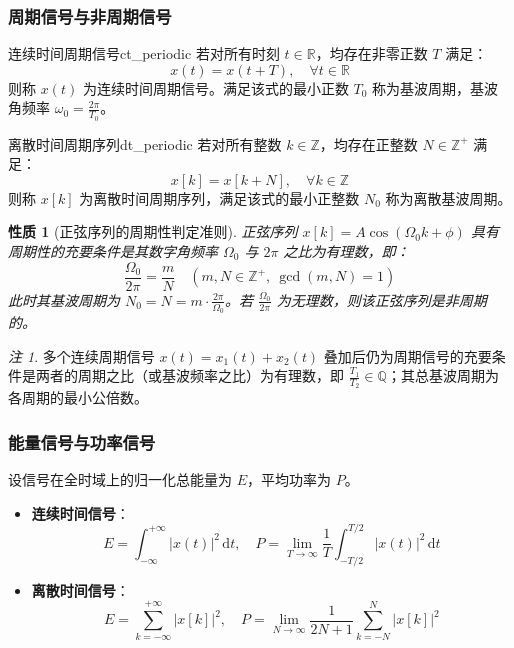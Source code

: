 \documentclass[11pt,a4paper,fontset=fandol]{ctexart}
\newtheorem{property}[theorem]{性质}
\theoremstyle{remark}
\newtheorem{remark}{注}[section]
\begin{document}
\subsubsection{周期信号与非周期信号}
\begin{definition}{连续时间周期信号}{ct_periodic}
若对所有时刻 $t \in \mathbb{R}$，均存在非零正数 $T$ 满足：
\begin{equation}
    x(t) = x(t + T), \quad \forall t \in \mathbb{R}
\end{equation}
则称 $x(t)$ 为连续时间周期信号。满足该式的最小正数 $T_0$ 称为基波周期，基波角频率 $\omega_0 = \frac{2\pi}{T_0}$。
\end{definition}

\begin{definition}{离散时间周期序列}{dt_periodic}
若对所有整数 $k \in \mathbb{Z}$，均存在正整数 $N \in \mathbb{Z}^+$ 满足：
\begin{equation}
    x[k] = x[k + N], \quad \forall k \in \mathbb{Z}
\end{equation}
则称 $x[k]$ 为离散时间周期序列，满足该式的最小正整数 $N_0$ 称为离散基波周期。
\end{definition}

\begin{property}[正弦序列的周期性判定准则]
正弦序列 $x[k] = A\cos(\Omega_0 k + \phi)$ 具有周期性的充要条件是其数字角频率 $\Omega_0$ 与 $2\pi$ 之比为有理数，即：
\begin{equation}
    \frac{\Omega_0}{2\pi} = \frac{m}{N} \quad (m, N \in \mathbb{Z}^+, \ \gcd(m, N) = 1)
\end{equation}
此时其基波周期为 $N_0 = N = m \cdot \frac{2\pi}{\Omega_0}$。若 $\frac{\Omega_0}{2\pi}$ 为无理数，则该正弦序列是非周期的。
\end{property}

\begin{remark}
多个连续周期信号 $x(t) = x_1(t) + x_2(t)$ 叠加后仍为周期信号的充要条件是两者的周期之比（或基波频率之比）为有理数，即 $\frac{T_1}{T_2} \in \mathbb{Q}$；其总基波周期为各周期的最小公倍数。
\end{remark}

\subsubsection{能量信号与功率信号}
设信号在全时域上的归一化总能量为 $E$，平均功率为 $P$。
\begin{itemize}
    \item \textbf{连续时间信号}：
    \begin{equation}
        E = \int_{-\infty}^{+\infty} |x(t)|^2\,\mathrm{d}t, \quad P = \lim_{T \to \infty} \frac{1}{T} \int_{-T/2}^{T/2} |x(t)|^2\,\mathrm{d}t
    \end{equation}
    \item \textbf{离散时间信号}：
    \begin{equation}
        E = \sum_{k=-\infty}^{+\infty} |x[k]|^2, \quad P = \lim_{N \to \infty} \frac{1}{2N + 1} \sum_{k=-N}^{N} |x[k]|^2
    \end{equation}
\end{itemize}
\end{document}
